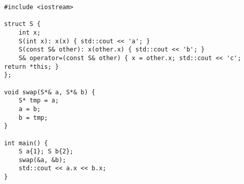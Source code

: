 \begin{lstlisting}[title=\href{https://godbolt.org/z/fmX0Eu}{\texttt{godbolt.org/z/fmX0Eu}}]
#include <iostream>

struct S { 
    int x;
    S(int x): x(x) { std::cout << 'a'; }
    S(const S& other): x(other.x) { std::cout << 'b'; }
    S& operator=(const S& other) { x = other.x; std::cout << 'c'; return *this; }
};

void swap(S*& a, S*& b) {
    S* tmp = a;
    a = b;
    b = tmp;
}

int main() {
    S a{1}; S b{2};
    swap(&a, &b);
    std::cout << a.x << b.x;
}
\end{lstlisting}
